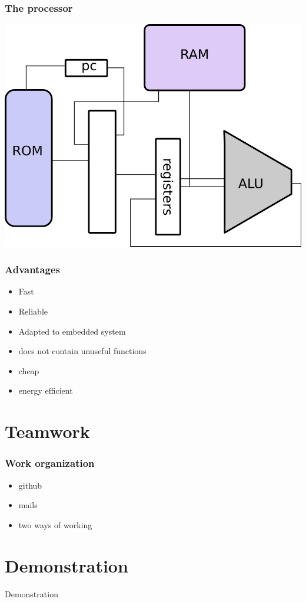 \documentclass[c]{beamer}
\begin{document}
\begin{frame}
\frametitle{The processor}
\includegraphics[scale=0.4]{schema_proc.png}

\end{frame}

\begin{frame}
\frametitle{Advantages}
\begin{itemize}
  \item Fast \pause
  \item Reliable \pause
  \item Adapted to embedded system 
  \item does not contain unuseful functions
  \item cheap
  \item energy efficient

\end{itemize}
\end{frame}

\section{Teamwork}

\begin{frame}
\frametitle{Work organization}
\begin{itemize}
\item github
\item mails
\item two ways of working
\end{itemize} 
\end{frame}

\section{Demonstration}

\begin{frame}
Demonstration
\end{frame}
\end{document}
